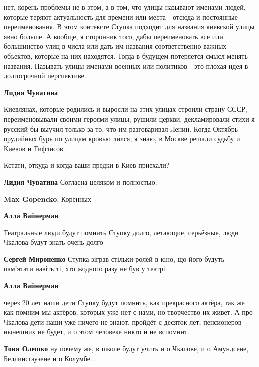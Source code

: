 \begin{itemize}
\begin{itemize}
\begin{itemize}
нет, корень проблемы не в этом, а в том, что улицы называют именами людей,
которые теряют актуальность для времени или места - отсюда и постоянные
переименования. В этом контексте Ступка подходит для названия киевской улицы
явно больше. А вообще, я сторонник того, дабы переименовать все или большинство
улиц в числа или дать им названия соответственно важных объектов, которые на
них находятся. Тогда в будущем потеряется смысл менять названия. Называть улицы
именами военных или политиков - это плохая идея в долгосрочной перспективе.

\textbf{Лидия Чуватина} 

Киевлянах, которые родились и выросли на этих улицах строили страну СССР,
переименовывали своими героями улицы, рушили церкви, декламировали стихи я
русский бы выучил только за то, что им разговаривал Ленин.  Когда Октябрь
орудийных бурь по улицам кровью ли́лся, я знаю, в Москве решали судьбу и Киевов
и Тифлисов.

Кстати, откуда и когда ваши предки в Киев приехали?

\textbf{Лидия Чуватина} Согласна целяком и полностью.

\textbf{Max Gopencko}. Коренных

\end{itemize} %

\textbf{Алла Вайнерман} 

Театральные люди будут помнить Ступку долго, летающие, серьёзные, люди Чкалова будут знать очень долго

\begin{itemize} %
\textbf{Сергей Мироненко} Ступка зіграв стільки ролей в кіно, що його будуть пам'ятати навіть ті, хто жодного разу не був у театрі.
\end{itemize} %

\textbf{Алла Вайнерман} 

через 20 лет наши дети Ступку будут помнить, как прекрасного актёра, так же как
помним мы актёров, которых уже нет с нами, но творчество их живет. А про
Чкалова дети наши уже ничего не знают, пройдёт с десяток лет, пенсионеров
нынешних не будет, и о этом человеке никто и не вспомнит.

\begin{itemize} %
\textbf{Тоня Олешко} ну почему же, в школе будут учить и о Чкалове, и о Амундсене, Беллинсгаузене и о Колумбе...


\end{itemize}
\end{itemize}
\end{itemize}
